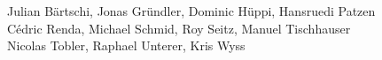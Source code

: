 %
%
%
Julian Bärtschi,
Jonas Gründler,
Dominic Hüppi,
Hansruedi Patzen%
\\
Cédric Renda,
Michael Schmid,
Roy Seitz,
Manuel Tischhauser%
\\
Nicolas Tobler,
Raphael Unterer,
Kris Wyss%
